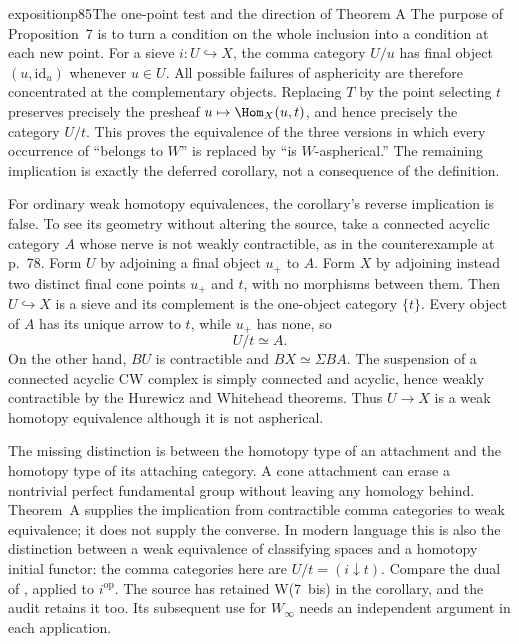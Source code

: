 \begin{dcomment}{exposition}{p85}{The one-point test and the direction of Theorem A}
The purpose of Proposition~7 is to turn a condition on the whole inclusion into a condition at each new point. For a sieve $i:U\hookrightarrow X$, the comma category $U/u$ has final object $(u,\mathrm{id}_u)$ whenever $u\in U$. All possible failures of asphericity are therefore concentrated at the complementary objects. Replacing $T$ by the point selecting $t$ preserves precisely the presheaf $u\mapsto\Hom_X(u,t)$, and hence precisely the category $U/t$. This proves the equivalence of the three versions in which every occurrence of ``belongs to $W$'' is replaced by ``is $W$-aspherical.'' The remaining implication is exactly the deferred corollary, not a consequence of the definition.

For ordinary weak homotopy equivalences, the corollary's reverse implication is false. To see its geometry without altering the source, take a connected acyclic category $A$ whose nerve is not weakly contractible, as in the counterexample at p.~78. Form $U$ by adjoining a final object $u_+$ to $A$. Form $X$ by adjoining instead two distinct final cone points $u_+$ and $t$, with no morphisms between them. Then $U\hookrightarrow X$ is a sieve and its complement is the one-object category $\{t\}$. Every object of $A$ has its unique arrow to $t$, while $u_+$ has none, so
\[
U/t\simeq A.
\]
On the other hand, $BU$ is contractible and $BX\simeq\Sigma BA$. The suspension of a connected acyclic CW complex is simply connected and acyclic, hence weakly contractible by the Hurewicz and Whitehead theorems. Thus $U\to X$ is a weak homotopy equivalence although it is not aspherical.

The missing distinction is between the homotopy type of an attachment and the homotopy type of its attaching category. A cone attachment can erase a nontrivial perfect fundamental group without leaving any homology behind. Theorem~A supplies the implication from contractible comma categories to weak equivalence; it does not supply the converse. In modern language this is also the distinction between a weak equivalence of classifying spaces and a homotopy initial functor: the comma categories here are $U/t=(i\downarrow t)$. Compare the dual of \citet[Theorem~4.1.3.1 and Corollary~4.1.3.3]{Lurie2009HTT}, applied to $i^{\mathrm{op}}$. The source has retained W(7~bis) in the corollary, and the audit retains it too. Its subsequent use for $W_\infty$ needs an independent argument in each application.
\end{dcomment}

